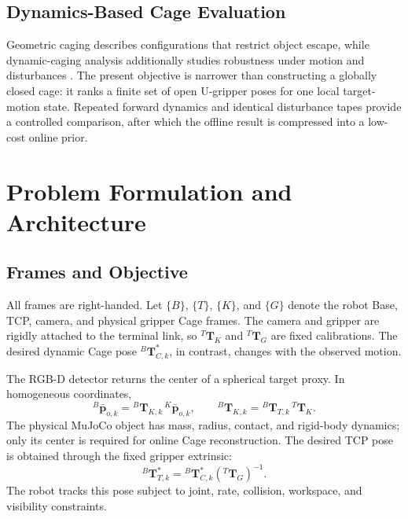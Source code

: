 \documentclass[conference]{IEEEtran}
\begin{document}
\subsection{Dynamics-Based Cage Evaluation}

Geometric caging describes configurations that restrict object escape, while dynamic-caging analysis additionally studies robustness under motion and disturbances \cite{dong2024caging}. The present objective is narrower than constructing a globally closed cage: it ranks a finite set of open U-gripper poses for one local target-motion state. Repeated forward dynamics and identical disturbance tapes provide a controlled comparison, after which the offline result is compressed into a low-cost online prior.

\section{Problem Formulation and Architecture}

\subsection{Frames and Objective}

All frames are right-handed. Let $\{B\}$, $\{T\}$, $\{K\}$, and $\{G\}$ denote the robot Base, TCP, camera, and physical gripper Cage frames. The camera and gripper are rigidly attached to the terminal link, so \({}^{T}\mathbf T_K\) and \({}^{T}\mathbf T_G\) are fixed calibrations. The desired dynamic Cage pose \({}^{B}\mathbf T^{*}_{C,k}\), in contrast, changes with the observed motion.

The RGB-D detector returns the center of a spherical target proxy. In homogeneous coordinates,
\begin{equation}
{}^{B}\bar{\mathbf p}_{o,k}
= {}^{B}\mathbf T_{K,k}\,{}^{K}\bar{\mathbf p}_{o,k},
\qquad
{}^{B}\mathbf T_{K,k}
= {}^{B}\mathbf T_{T,k}\,{}^{T}\mathbf T_K .
\label{eq:camera_to_base}
\end{equation}
The physical MuJoCo object has mass, radius, contact, and rigid-body dynamics; only its center is required for online Cage reconstruction. The desired TCP pose is obtained through the fixed gripper extrinsic:
\begin{equation}
{}^{B}\mathbf T^{*}_{T,k}
= {}^{B}\mathbf T^{*}_{C,k}
\left({}^{T}\mathbf T_G\right)^{-1}.
\label{eq:cage_to_tcp}
\end{equation}
The robot tracks this pose subject to joint, rate, collision, workspace, and visibility constraints.
\end{document}
